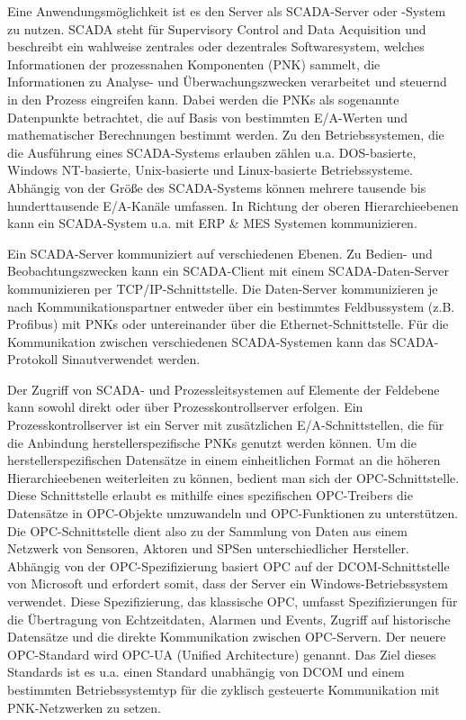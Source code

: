 Eine Anwendungsmöglichkeit ist es den Server als SCADA-Server oder -System zu nutzen. SCADA steht für Supervisory Control and Data Acquisition und beschreibt ein wahlweise zentrales oder dezentrales Softwaresystem, welches Informationen der prozessnahen Komponenten (PNK) sammelt, die Informationen zu Analyse- und Überwachungszwecken verarbeitet und steuernd in den Prozess eingreifen kann. Dabei werden die PNKs als sogenannte Datenpunkte betrachtet, die auf Basis von bestimmten E/A-Werten und mathematischer Berechnungen bestimmt werden. 
Zu den Betriebssystemen, die die Ausführung eines SCADA-Systems erlauben zählen u.a. DOS-basierte, Windows NT-basierte, Unix-basierte und Linux-basierte Betriebssysteme. Abhängig von der Größe des SCADA-Systems können mehrere tausende bis hunderttausende E/A-Kanäle umfassen. 
In Richtung der oberen Hierarchieebenen kann ein SCADA-System u.a. mit ERP & MES Systemen kommunizieren.

Ein SCADA-Server kommuniziert auf verschiedenen Ebenen. Zu Bedien- und Beobachtungszwecken kann ein SCADA-Client mit einem SCADA-Daten-Server kommunizieren per TCP/IP-Schnittstelle. Die Daten-Server kommunizieren je nach Kommunikationspartner entweder über ein bestimmtes Feldbussystem (z.B. Profibus) mit PNKs oder untereinander über die Ethernet-Schnittstelle. Für die Kommunikation zwischen verschiedenen SCADA-Systemen kann das SCADA-Protokoll \glqq Sinaut\grqq  verwendet werden.


Der Zugriff von SCADA- und Prozessleitsystemen auf Elemente der Feldebene kann sowohl direkt oder über Prozesskontrollserver erfolgen. Ein Prozesskontrollserver ist ein Server mit zusätzlichen E/A-Schnittstellen, die für die Anbindung herstellerspezifische PNKs genutzt werden können. Um die herstellerspezifischen Datensätze in einem einheitlichen Format an die höheren Hierarchieebenen weiterleiten zu können, bedient man sich der OPC-Schnittstelle. Diese Schnittstelle erlaubt es mithilfe eines spezifischen OPC-Treibers die Datensätze in OPC-Objekte umzuwandeln und OPC-Funktionen zu unterstützen. Die OPC-Schnittstelle dient also zu der Sammlung von Daten aus einem Netzwerk von Sensoren, Aktoren und SPSen unterschiedlicher Hersteller. 
Abhängig von der OPC-Spezifizierung basiert OPC auf der DCOM-Schnittstelle von Microsoft und erfordert somit, dass der Server ein Windows-Betriebssystem verwendet. Diese Spezifizierung, das klassische OPC, umfasst Spezifizierungen für die Übertragung von Echtzeitdaten, Alarmen und Events, Zugriff auf historische Datensätze und die direkte Kommunikation zwischen OPC-Servern.
Der neuere OPC-Standard wird OPC-UA (Unified Architecture) genannt. Das Ziel dieses Standards ist es u.a. einen Standard unabhängig von DCOM und einem bestimmten Betriebssystemtyp für die zyklisch gesteuerte Kommunikation mit PNK-Netzwerken zu setzen.


